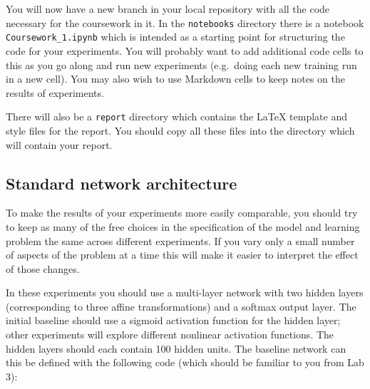 \documentclass[11pt,]{article}
\begin{document}
You will now have a new branch in your local repository with all the
code necessary for the coursework in it. In the \texttt{notebooks}
directory there is a notebook \texttt{Coursework\_1.ipynb} which is
intended as a starting point for structuring the code for your
experiments. You will probably want to add additional code cells to this
as you go along and run new experiments (e.g.~doing each new training
run in a new cell). You may also wish to use Markdown cells to keep
notes on the results of experiments.

There will also be a \verb+report+ directory which contains the LaTeX template and style files for the report.  You should copy all these files into the directory which will contain your report.


\subsection{Standard network
architecture}
\label{sec:standard-network-architecture}

To make the results of your experiments more easily comparable, you
should try to keep as many of the free choices in the specification of
the model and learning problem the same across different experiments. If
you vary only a small number of aspects of the problem at a time this
will make it easier to interpret the effect of those changes.

In these experiments you should use a multi-layer network with two hidden layers 
(corresponding to three affine transformations) and a softmax output layer.  The initial baseline
should use a sigmoid activation function for the hidden layer;   other experiments will explore
different nonlinear activation functions.  The hidden layers should each contain 100 hidden units.  
The baseline network can this be defined with the following code (which should be familiar to you from Lab 3):
\end{document}

